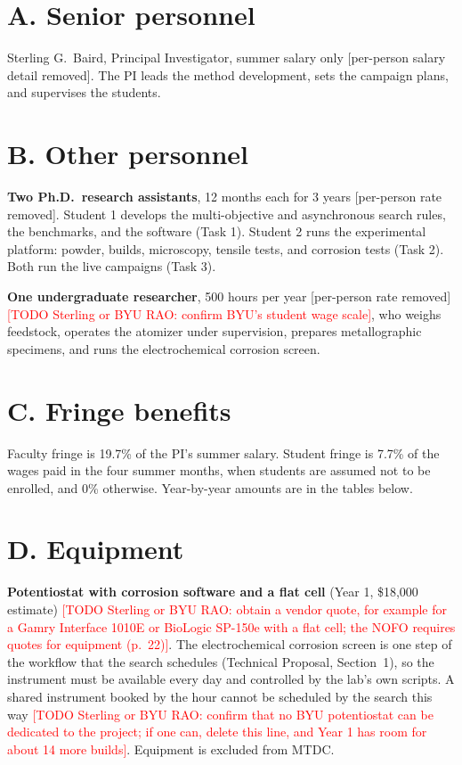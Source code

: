 \documentclass[11pt,letterpaper]{article}
\newcommand{\todo}[1]{\textcolor{red}{[TODO Sterling or BYU RAO: #1]}}
\begin{document}
\section*{A. Senior personnel}

Sterling G.\ Baird, Principal Investigator, summer salary only [per-person salary detail removed].
%
%
%
%
%
The PI leads the method development, sets the campaign
plans, and supervises the students.

\section*{B. Other personnel}

\textbf{Two Ph.D.\ research assistants}, 12 months each for 3 years
[per-person rate removed].
Student 1 develops the multi-objective and
asynchronous search rules, the benchmarks, and the software (Task 1).
Student 2 runs the experimental platform: powder, builds, microscopy,
tensile tests, and corrosion tests (Task 2). Both run the live campaigns
(Task 3).

\textbf{One undergraduate researcher}, 500 hours per year [per-person rate removed]
\todo{confirm BYU's student wage scale}, who weighs feedstock, operates the
atomizer under supervision, prepares metallographic specimens, and runs the
electrochemical corrosion screen.

\section*{C. Fringe benefits}

Faculty fringe is 19.7\% of the PI's summer salary. Student fringe is 7.7\%
of the wages paid in the four summer months, when students are assumed not
to be enrolled, and 0\% otherwise. Year-by-year amounts are in the tables
below.

\section*{D. Equipment}

\textbf{Potentiostat with corrosion software and a flat cell} (Year 1,
\$18,000 estimate) \todo{obtain a vendor quote, for example for a Gamry
Interface 1010E or BioLogic SP-150e with a flat cell; the NOFO requires
quotes for equipment (p.~22)}. The electrochemical corrosion screen is one
step of the workflow that the search schedules (Technical Proposal,
Section~1), so the instrument must be available every day and controlled by
the lab's own scripts. A shared instrument booked by the hour cannot be
scheduled by the search this way \todo{confirm that no BYU potentiostat can
be dedicated to the project; if one can, delete this line, and Year 1 has room
for about 14 more builds}. Equipment is excluded from MTDC.
\end{document}
